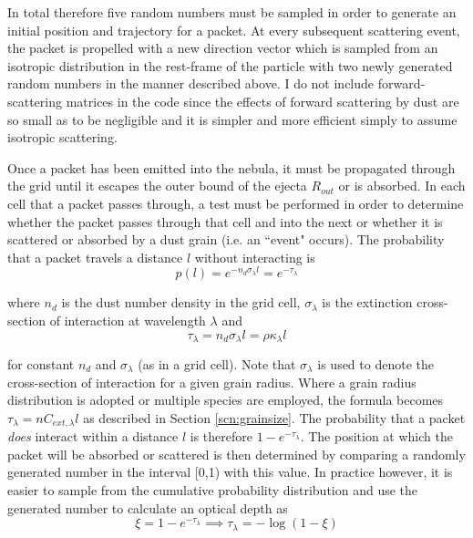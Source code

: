 In total therefore five random numbers must be sampled in order to generate an initial position and trajectory for a packet. At every subsequent scattering event, the packet is propelled with a new direction vector which is sampled from an isotropic distribution in the rest-frame of the particle with two newly generated random numbers in the manner described above.  I do not include forward-scattering matrices in the code since the effects of forward scattering by dust are so small as to be negligible and it is simpler and more efficient simply to assume isotropic scattering.  

Once a packet has been emitted into the nebula, it must be propagated through the grid until it escapes the outer bound of the ejecta $R_{out}$ or is absorbed.  In each cell that a packet passes through, a test must be performed in order to determine whether the packet passes through that cell and into the next or whether it is scattered or absorbed by a dust grain (i.e. an ``event" occurs).  The probability that a packet travels a distance $l$ without interacting is 
\begin{equation}
p(l)=e^{-n_d \sigma_{\lambda} l}=e ^{-\tau_{\lambda}} 
\end{equation}

\noindent where $n_d$ is the dust number density in the grid cell, $\sigma_{\lambda}$ is the extinction cross-section of interaction at wavelength $\lambda$ and 
\begin{equation}
\tau_{\lambda} = n_d\sigma_{\lambda} l = \rho \kappa_{\lambda}  l
\end{equation}

\noindent for constant $n_d$ and $\sigma_{\lambda}$ (as in a grid cell).  Note that $\sigma_{\lambda}$ is used to denote the cross-section of interaction for a given grain radius.  Where a grain radius distribution is adopted or multiple species are employed, the formula becomes $\tau_{\lambda} = nC_{ext,\lambda}l$ as described in Section \ref{scn:grainsize}.  The probability that a packet \textit{does} interact within a distance $l$ is therefore $1-e^{-\tau_{\lambda}}$.  The position at which the packet will be absorbed or scattered is then determined by comparing a randomly generated number in the interval [0,1) with this value.  In practice however, it is easier to sample from the cumulative probability distribution and use the generated number to calculate an optical depth as 
\begin{equation}
\xi = 1 - e^{-\tau_{\lambda}}  \implies  \tau_{\lambda}=-\log (1-\xi) 
\end{equation}

